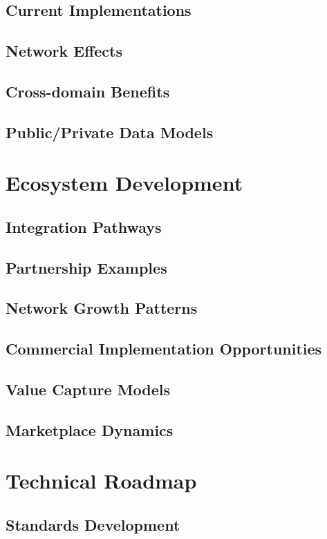 \documentclass[11pt]{article}
\begin{document}
\subsection{Current Implementations}
\subsection{Network Effects}
\subsection{Cross-domain Benefits}
\subsection{Public/Private Data Models}

\section{Ecosystem Development}
\subsection{Integration Pathways}
\subsection{Partnership Examples}
\subsection{Network Growth Patterns}
\subsection{Commercial Implementation Opportunities}
\subsection{Value Capture Models}
\subsection{Marketplace Dynamics}

\section{Technical Roadmap}
\subsection{Standards Development}
\end{document}
